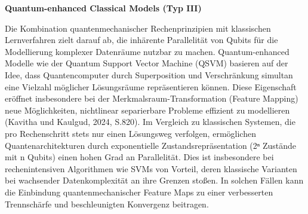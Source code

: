 \vspace{1.5em}
\noindent\textbf{Quantum-enhanced Classical Models (Typ III)}

\noindent
Die Kombination quantenmechanischer Rechenprinzipien mit klassischen Lernverfahren zielt darauf ab, die inhärente Parallelität von Qubits für die Modellierung komplexer Datenräume nutzbar zu machen. Quantum-enhanced Modelle wie der Quantum Support Vector Machine (QSVM) basieren auf der Idee, dass Quantencomputer durch Superposition und Verschränkung simultan eine Vielzahl möglicher Lösungsräume repräsentieren können. Diese Eigenschaft eröffnet insbesondere bei der Merkmalsraum-Transformation (Feature Mapping) neue Möglichkeiten, nichtlinear separierbare Probleme effizient zu modellieren (Kavitha und Kaulgud, 2024, S.820).
Im Vergleich zu klassischen Systemen, die pro Rechenschritt stets nur einen Lösungsweg verfolgen, ermöglichen Quantenarchitekturen durch exponentielle Zustandsrepräsentation (2ⁿ Zustände mit n Qubits) einen hohen Grad an Parallelität. Dies ist insbesondere bei rechenintensiven Algorithmen wie SVMs von Vorteil, deren klassische Varianten bei wachsender Datenkomplexität an ihre Grenzen stoßen. In solchen Fällen kann die Einbindung quantenmechanischer Feature Maps zu einer verbesserten Trennschärfe und beschleunigten Konvergenz beitragen.

